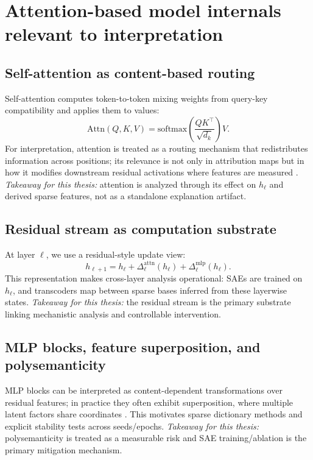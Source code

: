 \documentclass[../ppgc-tese.tex]{subfiles}
\begin{document}
\section{Attention-based model internals relevant to interpretation}
    \label{sec:attention-internals}
    \subsection{Self-attention as content-based routing}
    Self-attention computes token-to-token mixing weights from query-key compatibility and applies them to values:
    \[
    \mathrm{Attn}(Q,K,V)=\mathrm{softmax}\!\left(\frac{QK^\top}{\sqrt{d_k}}\right)V.
    \]
    For interpretation, attention is treated as a routing mechanism that redistributes information across positions; its relevance is not only in attribution maps but in how it modifies downstream residual activations where features are measured \cite{vaswani2017attention,olsson2022inductionheads}. \textit{Takeaway for this thesis:} attention is analyzed through its effect on $h_\ell$ and derived sparse features, not as a standalone explanation artifact.

    \subsection{Residual stream as computation substrate}
    At layer $\ell$, we use a residual-style update view:
    \[
    h_{\ell+1} = h_{\ell} + \Delta^{\text{attn}}_{\ell}(h_{\ell}) + \Delta^{\text{mlp}}_{\ell}(h_{\ell}).
    \]
    This representation makes cross-layer analysis operational: SAEs are trained on $h_\ell$, and transcoders map between sparse bases inferred from these layerwise states.
    \textit{Takeaway for this thesis:} the residual stream is the primary substrate linking mechanistic analysis and controllable intervention.

    \subsection{MLP blocks, feature superposition, and polysemanticity}
    MLP blocks can be interpreted as content-dependent transformations over residual features; in practice they often exhibit superposition, where multiple latent factors share coordinates \cite{geva2021ffn,anthropic2022superposition}. This motivates sparse dictionary methods and explicit stability tests across seeds/epochs.
    \textit{Takeaway for this thesis:} polysemanticity is treated as a measurable risk and SAE training/ablation is the primary mitigation mechanism.
\end{document}

